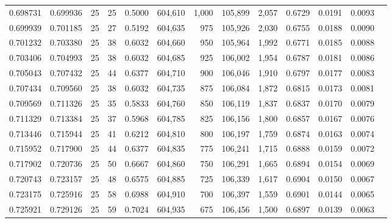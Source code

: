 \begin{tabular}{rrrrrrrrrrrrr}
0.698731 & 0.699936 &    25 &  25 &                                     0.5000 & 604,610 &   1,000 & 105,899 &   2,057 & 0.6729 & 0.0191 & 0.0093 \\
0.699939 & 0.701185 &    25 &  27 &                                     0.5192 & 604,635 &     975 & 105,926 &   2,030 & 0.6755 & 0.0188 & 0.0090 \\
0.701232 & 0.703380 &    25 &  38 &                                     0.6032 & 604,660 &     950 & 105,964 &   1,992 & 0.6771 & 0.0185 & 0.0088 \\
0.703406 & 0.704993 &    25 &  38 &                                     0.6032 & 604,685 &     925 & 106,002 &   1,954 & 0.6787 & 0.0181 & 0.0086 \\
0.705043 & 0.707432 &    25 &  44 &                                     0.6377 & 604,710 &     900 & 106,046 &   1,910 & 0.6797 & 0.0177 & 0.0083 \\
0.707434 & 0.709560 &    25 &  38 &                                     0.6032 & 604,735 &     875 & 106,084 &   1,872 & 0.6815 & 0.0173 & 0.0081 \\
0.709569 & 0.711326 &    25 &  35 &                                     0.5833 & 604,760 &     850 & 106,119 &   1,837 & 0.6837 & 0.0170 & 0.0079 \\
0.711329 & 0.713384 &    25 &  37 &                                     0.5968 & 604,785 &     825 & 106,156 &   1,800 & 0.6857 & 0.0167 & 0.0076 \\
0.713446 & 0.715944 &    25 &  41 &                                     0.6212 & 604,810 &     800 & 106,197 &   1,759 & 0.6874 & 0.0163 & 0.0074 \\
0.715952 & 0.717900 &    25 &  44 &                                     0.6377 & 604,835 &     775 & 106,241 &   1,715 & 0.6888 & 0.0159 & 0.0072 \\
0.717902 & 0.720736 &    25 &  50 &                                     0.6667 & 604,860 &     750 & 106,291 &   1,665 & 0.6894 & 0.0154 & 0.0069 \\
0.720743 & 0.723157 &    25 &  48 &                                     0.6575 & 604,885 &     725 & 106,339 &   1,617 & 0.6904 & 0.0150 & 0.0067 \\
0.723175 & 0.725916 &    25 &  58 &                                     0.6988 & 604,910 &     700 & 106,397 &   1,559 & 0.6901 & 0.0144 & 0.0065 \\
0.725921 & 0.729126 &    25 &  59 &                                     0.7024 & 604,935 &     675 & 106,456 &   1,500 & 0.6897 & 0.0139 & 0.0063 \\

\end{tabular}
